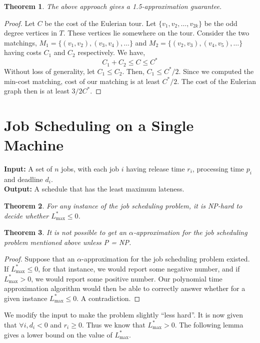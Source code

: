\documentclass[10pt]{article}
\newtheorem{theorem}{Theorem}[section]
\begin{document}
\begin{theorem}
The above approach gives a 1.5-approximation guarantee.
\end{theorem}
\begin{proof}
Let $C$ be the cost of the Eulerian tour. Let $\{v_1, v_2, \ldots, v_{2k}\}$ be the odd degree vertices in $T$. These vertices lie somewhere on the tour. Consider the two matchings, $M_1 = \{(v_1, v_2), (v_3, v_4), \ldots \}$ and $M_2 = \{(v_2, v_3), (v_4, v_5), \ldots \}$ having costs $C_1$ and $C_2$ respectively. We have, 
\[
C_1 + C_2 \leq C \leq C^*
\]
Without loss of generality, let $C_1 \leq C_2$. Then, $C_1 \leq C^*/2$. Since we computed the min-cost matching, cost of our matching is at least $C^*/2$. The cost of the Eulerian graph then is at least $3/2C^*$.
\end{proof}

\section{Job Scheduling on a Single Machine}
\textbf{Input: } A set of $n$ jobs, with each job $i$ having release time $r_i$, processing time $p_i$ and deadline $d_i$. \\
\textbf{Output: } A schedule that has the least maximum lateness. \\

\begin{theorem}
For any instance of the job scheduling problem, it is NP-hard to decide whether $L_{\max}^* \leq 0$.
\end{theorem}

\begin{theorem}
It is not possible to get an $\alpha $-approximation for the job scheduling problem mentioned above unless P = NP.
\end{theorem}
\begin{proof}
Suppose that an $\alpha$-approximation for the job scheduling problem existed. If $L_{\max}^* \leq 0$, for that instance, we would report some negative number, and if $L_{\max}^* > 0$, we would report some positive number. Our polynomial time approximation algorithm would then be able to correctly answer whether for a given instance $L_{\max}^* \leq 0$. A contradiction.
\end{proof}
\bigskip

We modify the input to make the problem slightly ``less hard''. It is now given that $\forall i, d_i < 0$ and $r_i \geq 0$. Thus we know that $L_{\max}^* > 0$. The following lemma gives a lower bound on the value of $L_{\max}^*$.
\end{document}
